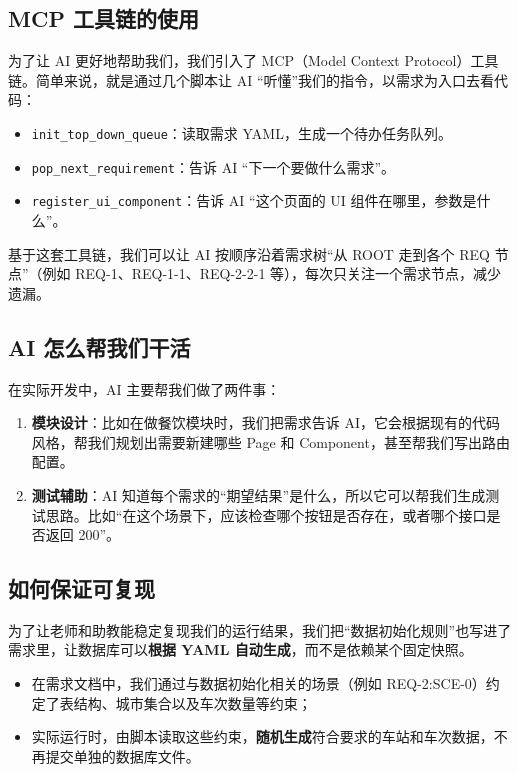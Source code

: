 \documentclass{article}
\begin{document}
\subsection{MCP 工具链的使用}

为了让 AI 更好地帮助我们，我们引入了 MCP（Model Context Protocol）工具链。简单来说，就是通过几个脚本让 AI “听懂”我们的指令，以需求为入口去看代码：

\begin{itemize}
    \item \texttt{init\_top\_down\_queue}：读取需求 YAML，生成一个待办任务队列。
    \item \texttt{pop\_next\_requirement}：告诉 AI “下一个要做什么需求”。
    \item \texttt{register\_ui\_component}：告诉 AI “这个页面的 UI 组件在哪里，参数是什么”。
\end{itemize}

基于这套工具链，我们可以让 AI 按顺序沿着需求树“从 ROOT 走到各个 REQ 节点”（例如 REQ-1、REQ-1-1、REQ-2-2-1 等），每次只关注一个需求节点，减少遗漏。

\subsection{AI 怎么帮我们干活}

在实际开发中，AI 主要帮我们做了两件事：
\begin{enumerate}
    \item \textbf{模块设计}：比如在做餐饮模块时，我们把需求告诉 AI，它会根据现有的代码风格，帮我们规划出需要新建哪些 Page 和 Component，甚至帮我们写出路由配置。
    \item \textbf{测试辅助}：AI 知道每个需求的“期望结果”是什么，所以它可以帮我们生成测试思路。比如“在这个场景下，应该检查哪个按钮是否存在，或者哪个接口是否返回 200”。
\end{enumerate}

\subsection{如何保证可复现}
 
为了让老师和助教能稳定复现我们的运行结果，我们把“数据初始化规则”也写进了需求里，让数据库可以\textbf{根据 YAML 自动生成}，而不是依赖某个固定快照。
 
\begin{itemize}
    \item 在需求文档中，我们通过与数据初始化相关的场景（例如 REQ-2:SCE-0）约定了表结构、城市集合以及车次数量等约束；
    \item 实际运行时，由脚本读取这些约束，\textbf{随机生成}符合要求的车站和车次数据，不再提交单独的数据库文件。
\end{itemize}
 
\end{document}
